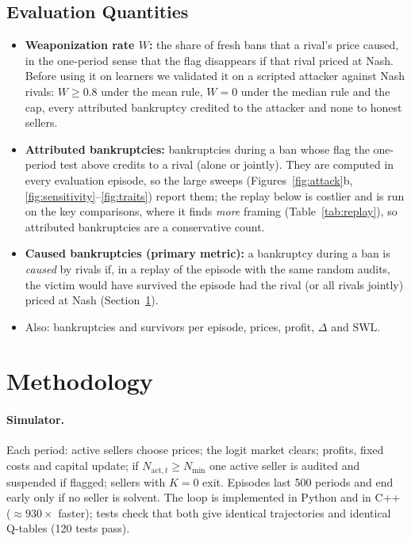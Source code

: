 \documentclass{article}
\newcommand{\Nact}{N_{\mathrm{act},t}}
\newcommand{\Nmin}{N_{\min}}
\begin{document}
\subsection{Evaluation Quantities}\label{sec:eval}
\begin{itemize}
\item \textbf{Weaponization rate $W$:} the share of fresh bans that a rival's price caused, in the one-period sense that the flag disappears if that rival priced at Nash. Before using it on learners we validated it on a scripted attacker against Nash rivals: $W\ge0.8$ under the mean rule, $W=0$ under the median rule and the cap, every attributed bankruptcy credited to the attacker and none to honest sellers.
\item \textbf{Attributed bankruptcies:} bankruptcies during a ban whose flag the one-period test above credits to a rival (alone or jointly). They are computed in every evaluation episode, so the large sweeps (Figures~\ref{fig:attack}b, \ref{fig:sensitivity}--\ref{fig:traits}) report them; the replay below is costlier and is run on the key comparisons, where it finds \emph{more} framing (Table~\ref{tab:replay}), so attributed bankruptcies are a conservative count.
\item \textbf{Caused bankruptcies (primary metric):} a bankruptcy during a ban is \emph{caused} by rivals if, in a replay of the episode with the same random audits, the victim would have survived the episode had the rival (or all rivals jointly) priced at Nash (Section~\ref{sec:method}).
\item Also: bankruptcies and survivors per episode, prices, profit, $\Delta$ and $\mathrm{SWL}$.
\end{itemize}

\section{Methodology}
\label{sec:method}

\paragraph{Simulator.} Each period: active sellers choose prices; the logit market clears; profits, fixed costs and capital update; if $\Nact\ge\Nmin$ one active seller is audited and suspended if flagged; sellers with $K=0$ exit. Episodes last 500 periods and end early only if no seller is solvent. The loop is implemented in Python and in C++ ($\approx930\times$ faster); tests check that both give identical trajectories and identical Q-tables (120 tests pass).
\end{document}

